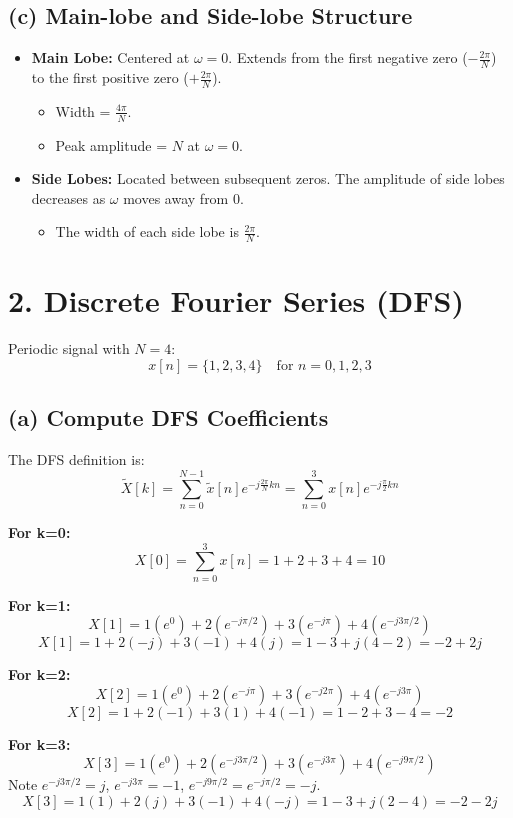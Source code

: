 \documentclass[11pt, a4paper]{article}
\begin{document}
\subsection{(c) Main-lobe and Side-lobe Structure}
\begin{itemize}
    \item \textbf{Main Lobe:} Centered at $\omega = 0$. Extends from the first negative zero ($-\frac{2\pi}{N}$) to the first positive zero ($+\frac{2\pi}{N}$).
    \begin{itemize}
        \item Width = $\frac{4\pi}{N}$.
        \item Peak amplitude = $N$ at $\omega = 0$.
    \end{itemize}
    \item \textbf{Side Lobes:} Located between subsequent zeros. The amplitude of side lobes decreases as $\omega$ moves away from 0.
    \begin{itemize}
        \item The width of each side lobe is $\frac{2\pi}{N}$.
    \end{itemize}
\end{itemize}

\section{2. Discrete Fourier Series (DFS)}
Periodic signal with $N=4$:
$$ x[n] = \{1, 2, 3, 4\} \quad \text{for } n=0,1,2,3 $$

\subsection{(a) Compute DFS Coefficients}
The DFS definition is:
$$ \tilde{X}[k] = \sum_{n=0}^{N-1} \tilde{x}[n] e^{-j\frac{2\pi}{N}kn} = \sum_{n=0}^{3} x[n] e^{-j\frac{\pi}{2}kn} $$

\textbf{For k=0:}
$$ X[0] = \sum_{n=0}^{3} x[n] = 1 + 2 + 3 + 4 = 10 $$

\textbf{For k=1:}
$$ X[1] = 1(e^0) + 2(e^{-j\pi/2}) + 3(e^{-j\pi}) + 4(e^{-j3\pi/2}) $$
$$ X[1] = 1 + 2(-j) + 3(-1) + 4(j) = 1 - 3 + j(4-2) = -2 + 2j $$

\textbf{For k=2:}
$$ X[2] = 1(e^0) + 2(e^{-j\pi}) + 3(e^{-j2\pi}) + 4(e^{-j3\pi}) $$
$$ X[2] = 1 + 2(-1) + 3(1) + 4(-1) = 1 - 2 + 3 - 4 = -2 $$

\textbf{For k=3:}
$$ X[3] = 1(e^0) + 2(e^{-j3\pi/2}) + 3(e^{-j3\pi}) + 4(e^{-j9\pi/2}) $$
Note $e^{-j3\pi/2} = j$, $e^{-j3\pi} = -1$, $e^{-j9\pi/2} = e^{-j\pi/2} = -j$.
$$ X[3] = 1(1) + 2(j) + 3(-1) + 4(-j) = 1 - 3 + j(2-4) = -2 - 2j $$
\end{document}

